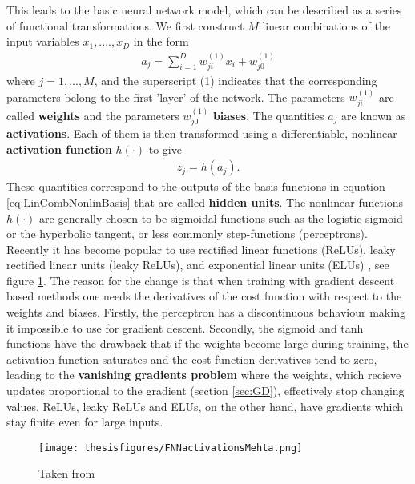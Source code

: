 \documentclass[twoside,english]{uiofysmaster}
\begin{document}
This leads to the basic neural network model, which can be described as a series of functional transformations. We first construct $M$ linear combinations of the input variables $x_1, ...., x_D$ in the form
\begin{align}
	a_j = \sum_{i=1}^D w_{ji}^{(1)} x_i + w_{j 0}^{(1)}
\end{align}
where $j=1, ..., M$, and the superscript (1) indicates that the corresponding parameters belong to the first 'layer' of the network. The parameters $w_{ji}^{(1)}$ are called \textbf{weights} and the parameters $w_{j0}^{(1)}$ \textbf{biases}. The quantities $a_j$ are known as \textbf{activations}. Each of them is then transformed using a differentiable, nonlinear \textbf{activation function} $h(\cdot)$ to give
\begin{align}
	z_j = h(a_j).  \label{eq:HiddenUnits}
\end{align}
These quantities correspond to the outputs of the basis functions in equation \ref{eq:LinCombNonlinBasis} that are called \textbf{hidden units}. The nonlinear functions $h(\cdot)$ are generally chosen to be sigmoidal functions such as the logistic sigmoid or the hyperbolic tangent, or less commonly step-functions (perceptrons). Recently it has become popular to use rectified linear functions (ReLUs), leaky rectified linear units (leaky ReLUs), and exponential linear units (ELUs) \cite{Mehta2018}, see figure \ref{fig:FNNactivationsMehta}. The reason for the change is that when training with gradient descent based methods one needs the derivatives of the cost function with respect to the weights and biases. Firstly, the perceptron has a discontinuous behaviour making it impossible to use for gradient descent. Secondly, the sigmoid and tanh functions have the drawback that if the weights become large during training, the activation function saturates and the cost function derivatives tend to zero, leading to the \textbf{vanishing gradients problem} where the weights, which recieve updates proportional to the gradient (section \ref{sec:GD}), effectively stop changing values. ReLUs, leaky ReLUs and ELUs, on the other hand, have gradients which stay finite even for large inputs. 




\begin{figure}
\centering
 \texttt{[image: thesisfigures/FNNactivationsMehta.png]}
 \caption{Taken from \cite{Mehta2018}}
 \label{fig:FNNactivationsMehta}
\end{figure}
\end{document}
